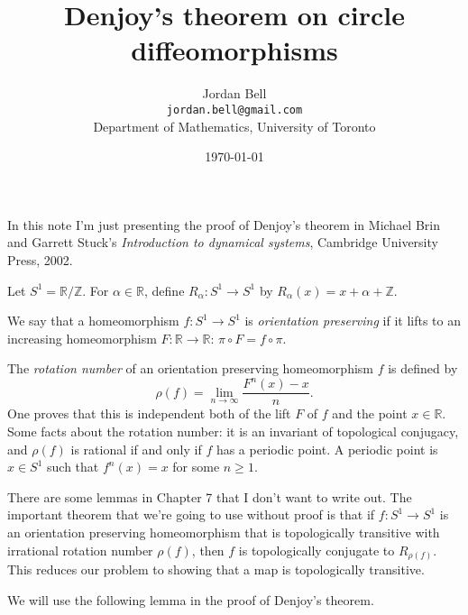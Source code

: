 \documentclass{article}
\begin{document}
\title{Denjoy's theorem on circle diffeomorphisms}
\author{Jordan Bell\\ \texttt{jordan.bell@gmail.com}\\Department of Mathematics, University of Toronto}
\date{\today}
\maketitle

In this note I'm just presenting the proof of Denjoy's theorem in Michael Brin and Garrett Stuck's {\em Introduction
to dynamical systems}, Cambridge University Press, 2002. 

Let $S^1=\mathbb{R}/\mathbb{Z}$. For $\alpha \in \mathbb{R}$, define $R_\alpha:S^1 \to S^1$ by $R_\alpha(x)=x+\alpha
+\mathbb{Z}$.

We say that a homeomorphism $f:S^1 \to S^1$ is {\em orientation preserving} if it lifts to an increasing homeomorphism
$F:\mathbb{R} \to \mathbb{R}$: $\pi \circ F=f \circ \pi$.

The {\em rotation number} of an orientation preserving homeomorphism $f$ is defined by
\[
\rho(f)=\lim_{n \to \infty} \frac{F^n(x)-x}{n}.
\]
One proves that this is independent both of the lift $F$ of $f$ and the point $x \in \mathbb{R}$.
Some facts about the rotation number: it is an invariant of topological conjugacy, and $\rho(f)$ is rational if and only
if $f$ has a periodic point. A periodic point is $x \in S^1$ such that $f^n(x)=x$ for some $n \geq 1$.

There are some lemmas in Chapter 7 that I don't want to write out. The important theorem that
we're going to use without proof
is that if $f:S^1 \to S^1$ is an orientation preserving homeomorphism that is topologically
transitive with irrational rotation
number $\rho(f)$, then $f$ is topologically conjugate to $R_{\rho(f)}$. 
This reduces our problem to showing that a map is topologically transitive.

We will use the following lemma in the proof of Denjoy's theorem.
\end{document}
